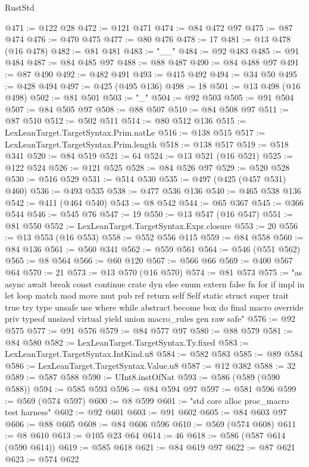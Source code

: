 \begin{lexlean}{RustStd}
\begin{coremodule}
{\begin{coremodule}
{{{{{{{{{{{{{{{{{{{{{{{{{{{{{{{{{{{{{{{{{{{{{{{{{{{{{{@471 := @122 @28
@472 := @121 @471
@474 := @84 @472 @97
@475 := @87 @474
@476 := @470 @475
@477 := @80 @476
@478 := 17
@481 := @13 @478 (@16 @478)
@482 := @81 @481
@483 := "__"
@484 := @92 @483
@485 := @91 @484
@487 := @84 @485 @97
@488 := @88 @487
@490 := @84 @488 @97
@491 := @87 @490
@492 := @482 @491
@493 := @415 @492
@494 := @34 @50
@495 := @428 @494
@497 := @425 (@495 @136)
@498 := 18
@501 := @13 @498 (@16 @498)
@502 := @81 @501
@503 := "_"
@504 := @92 @503
@505 := @91 @504
@507 := @84 @505 @97
@508 := @88 @507
@510 := @84 @508 @97
@511 := @87 @510
@512 := @502 @511
@514 := @80 @512 @136
@515 := LexLeanTarget.TargetSyntax.Prim.natLe
@516 := @138 @515
@517 := LexLeanTarget.TargetSyntax.Prim.length
@518 := @138 @517
@519 := @518 @341
@520 := @84 @519
@521 := 64
@524 := @13 @521 (@16 @521)
@525 := @122 @524
@526 := @121 @525
@528 := @84 @526 @97
@529 := @520 @528
@530 := @516 @529
@531 := @514 @530
@535 := @497 (@425 (@457 @531) @460)
@536 := @493 @535
@538 := @477 @536 @136
@540 := @465 @538 @136
@542 := @411 (@464 @540)
@543 := @8 @542
@544 := @65 @367
@545 := @366 @544
@546 := @545 @76
@547 := 19
@550 := @13 @547 (@16 @547)
@551 := @81 @550
@552 := LexLeanTarget.TargetSyntax.Expr.closure
@553 := 20
@556 := @13 @553 (@16 @553)
@558 := @552 @556 @115
@559 := @84 @558
@560 := @84 @136
@561 := @560 @341
@562 := @559 @561
@564 := @546 (@551 @562)
@565 := @8 @564
@566 := @60 @120
@567 := @566 @66
@569 := @400 @567 @64
@570 := 21
@573 := @13 @570 (@16 @570)
@574 := @81 @573
@575 := "as async await break const continue crate dyn else enum extern false fn for if impl in let loop match mod move mut pub ref return self Self static struct super trait true try type unsafe use where while abstract become box do final macro override priv typeof unsized virtual yield union macro_rules gen raw safe"
@576 := @92 @575
@577 := @91 @576
@579 := @84 @577 @97
@580 := @88 @579
@581 := @84 @580
@582 := LexLeanTarget.TargetSyntax.Ty.fixed
@583 := LexLeanTarget.TargetSyntax.IntKind.u8
@584 := @582 @583
@585 := @89 @584
@586 := LexLeanTarget.TargetSyntax.Value.u8
@587 := @12 @382
@588 := 32
@589 := @587 @588
@590 := UInt8.instOfNat
@593 := @586 (@589 (@590 @588))
@594 := @585 @593
@596 := @84 @594 @97
@597 := @581 @596
@599 := @569 (@574 @597)
@600 := @8 @599
@601 := "std core alloc proc_macro test harness"
@602 := @92 @601
@603 := @91 @602
@605 := @84 @603 @97
@606 := @88 @605
@608 := @84 @606 @596
@610 := @569 (@574 @608)
@611 := @8 @610
@613 := @105 @23 @64
@614 := 46
@618 := @586 (@587 @614 (@590 @614))
@619 := @585 @618
@621 := @84 @619 @97
@622 := @87 @621
@623 := @574 @622
}}}}}}}}}}}}}}}}}}}}}}}}}}}}}}}}}}}}}}}}}}}}}}}}}}}}}}
\end{coremodule}}
\end{coremodule}
\end{lexlean}

